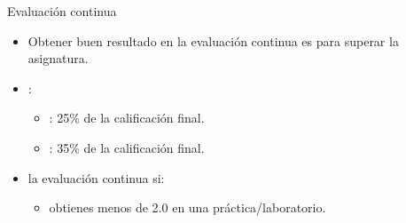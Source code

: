 \begin{frame}[t]{Evaluación continua}
\begin{itemize}
  \item Obtener buen resultado en la evaluación continua es  para superar 
        la asignatura.
  
  \item {}:
    \begin{itemize}
      \item {}: 25\% de la calificación final.
      \item {}: 35\% de la calificación final.
    \end{itemize}
  
  \item {} la evaluación continua si:
    \begin{itemize}
      \item obtienes menos de 2.0 en una práctica/laboratorio.
    \end{itemize}
\end{itemize}
\end{frame}

